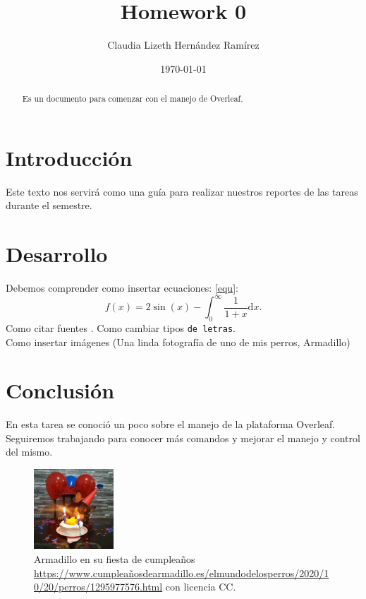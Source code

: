 \documentclass{article}
\author{Claudia Lizeth Hern\'andez Ram\'irez} %
\title{Homework 0} %
\date{\today}
\begin{document}

\maketitle %

\begin{abstract} %
  \centering
  Es un documento para comenzar con el manejo de Overleaf.
\end{abstract}

\section{Introducci\'{o}n}\label{intro} %


Este texto nos servir\'a como una gu\'ia para realizar nuestros reportes de las tareas durante el semestre. 



\section{Desarrollo}\label{desarrollo} %
Debemos comprender como insertar ecuaciones: \eqref{equ}:
\begin{equation}
  f(x) = 2 \sin(x) - \int_0^\infty \frac{1}{1 + x} \text{d}x.
  \label{equ}
\end{equation}
Como citar fuentes \citep{ejemplo} .
\textsf{Como cambiar tipos } \texttt{de letras}.\\
Como insertar im\'agenes (Una linda fotografía de uno de mis perros, Armadillo)


\section{Conclusi\'on}

En esta tarea se conoci\'o un poco sobre el manejo de la plataforma Overleaf. Seguiremos trabajando para conocer  m\'as comandos y mejorar el manejo y control del mismo.



\begin{figure} %
    \centering
    \includegraphics[width=30mm]{armadillo.jpg} %
    \caption{Armadillo en su fiesta de cumpleaños \url{https://www.cumpleañosdearmadillo.es/elmundodelosperros/2020/10/20/perros/1295977576.html} con licencia CC.}
    \label{armadillo}
\end{figure}





\end{document}
